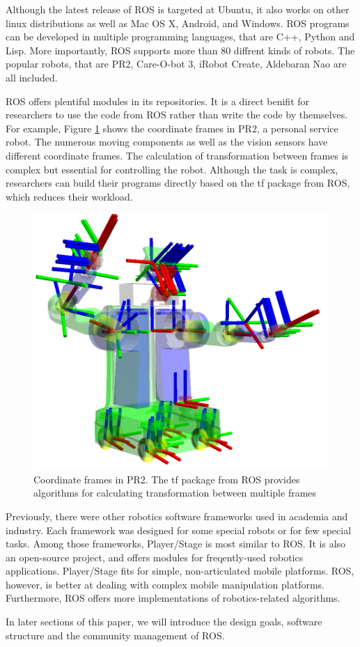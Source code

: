 \documentclass[a4paper, 10pt, conference]{ieeeconf}       %
\begin{document}
Although the latest release of ROS is targeted at Ubuntu, it also works on other linux distributions as well as Mac OS X, Android, and Windows. ROS programs can be developed in multiple programming languages, that are C++, Python and Lisp. More importantly, ROS supports more than 80 diffrent kinds of robots. The popular robots, that are PR2, Care-O-bot 3, iRobot Create, Aldebaran Nao are all included.

ROS offers plentiful modules in its repositories. It is a direct benifit for researchers to use the code from ROS rather than write the code by themselves. For example, Figure \ref{fig:tf} shows the coordinate frames in PR2, a personal service robot. The numerous moving components as well as the vision sensors have different coordinate frames. The calculation of transformation between frames is complex but essential for controlling the robot. Although the task is complex, researchers can build their programs directly based on the tf package from ROS, which reduces their workload.

\begin{figure}[htpb]
  \centering
  \includegraphics[width=.4\textwidth]{tf_pr2}
  \caption{Coordinate frames in PR2. The tf package from ROS provides algorithms for calculating transformation between multiple frames}
  \label{fig:tf}
\end{figure}

Previously, there were other robotics software frameworks used in academia and industry\cite{kramer_development_2007}. Each framework was designed for some special robots or for few special tasks. Among those frameworks, Player/Stage\cite{collett_player_2005} is most similar to ROS. It is also an open-source project, and offers modules for freqently-used robotics applications. Player/Stage fits for simple, non-articulated mobile platforms. ROS, however, is better at dealing with complex mobile manipulation platforms. Furthermore, ROS offers more implementations of robotics-related algorithms.

In later sections of this paper, we will introduce the design goals, software structure and the community management of ROS. 
\end{document}
